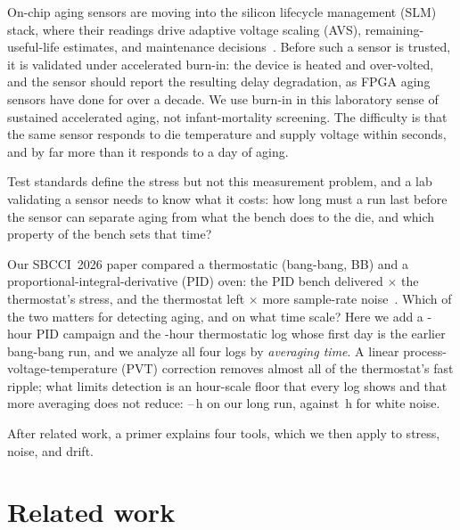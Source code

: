 \documentclass[10pt,twocolumn]{article}
\begin{document}
\noindent On-chip aging sensors are moving into the silicon lifecycle management (SLM) stack, where their readings drive adaptive voltage scaling (AVS), remaining-useful-life estimates, and maintenance decisions~\cite{kashyap,niemann}. Before such a sensor is trusted, it is validated under accelerated burn-in: the device is heated and over-volted, and the sensor should report the resulting delay degradation, as FPGA aging sensors have done for over a decade. We use burn-in in this laboratory sense of sustained accelerated aging, not infant-mortality screening. The difficulty is that the same sensor responds to die temperature and supply voltage within seconds, and by far more than it responds to a day of aging.

Test standards define the stress but not this measurement problem, and a lab validating a sensor needs to know what it costs: how long must a run last before the sensor can separate aging from what the bench does to the die, and which property of the bench sets that time?

Our SBCCI~2026 paper compared a thermostatic (bang-bang, BB) and a proportional-integral-derivative (PID) oven: the PID bench delivered \vAFratio$\times$ the thermostat's stress, and the thermostat left \vSigRawRatio$\times$ more sample-rate noise~\cite{sbcci26}. Which of the two matters for detecting aging, and on what time scale? Here we add a \vDurRCA-hour PID campaign and the \vDurBBlong-hour thermostatic log whose first day is the earlier bang-bang run, and we analyze all four logs by \emph{averaging time}. A linear process-voltage-temperature (PVT) correction removes almost all of the thermostat's fast ripple; what limits detection is an hour-scale floor that every log shows and that more averaging does not reduce: \vDetLo--\vDetHi\,h on our long run, against \vTminBound\,h for white noise.

After related work, a primer explains four tools, which we then apply to stress, noise, and drift.

\section{Related work}
\end{document}
